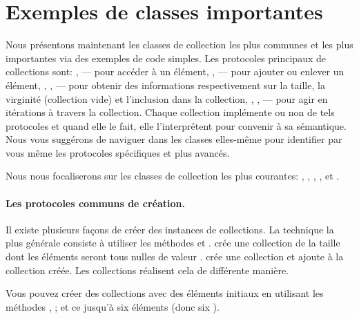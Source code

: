 \documentclass[a4paper,10pt,twoside]{book}
\begin{document}
\section{Exemples de classes importantes}
Nous pr\'esentons maintenant les classes de collection les plus communes et les plus importantes via des exemples de code simples.
Les protocoles principaux de collections sont: ,  --- pour acc\'eder \`a un \'el\'ement, ,  --- pour ajouter ou enlever un \'el\'ement, , ,  --- pour obtenir des informations respectivement sur la taille, la virginit\'e (collection vide) et l'inclusion dans la collection, , ,  --- pour agir en it\'erations \`a travers la collection.
Chaque collection impl\'emente ou non de tels protocoles et quand elle 
le fait, elle l'interpr\'etent pour convenir \`a sa s\'emantique.
Nous vous sugg\'erons de naviguer dans les classes elles-m\^eme pour
identifier par vous m\^eme les protocoles sp\'ecifiques et plus
avanc\'es.

Nous nous focaliserons sur les classes de collection les plus courantes:
, , , ,  et .

\paragraph{Les protocoles communs de cr\'eation.}
Il existe plusieurs fa\c{c}ons de cr\'eer des instances de collections.
La technique la plus g\'en\'erale consiste \`a utiliser les m\'ethodes
 et .
 cr\'ee une collection de la taille  
dont les \'el\'ements seront tous nulles \cad de valeur . 
  cr\'ee une collection
et ajoute  \`a la collection cr\'e\'ee. 
Les collections r\'ealisent cela de diff\'erente mani\`ere.

Vous pouvez cr\'eer des collections avec des \'el\'ements initiaux
en utilisant les m\'ethodes \mbox{,}
 \etc; et ce jusqu'\`a 
six \'el\'ements (donc six ).
\end{document}
